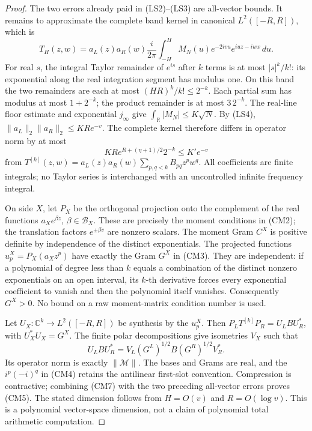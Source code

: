 \documentclass[11pt]{article}
\theoremstyle{remark}\newtheorem{remark}[theorem]{Remark}
\newcommand{\R}{\mathbb R}
\begin{document}
\begin{proof}
The two errors already paid in (LS2)--(LS3) are all-vector bounds.
It remains to approximate the complete band kernel in canonical
\(L^2([-R,R])\), which is
\[
 T_H(z,w)=a_L(z)a_R(w)\frac{i}{2\pi}
           \int_{-H}^H M_N(u)e^{-2ivu}e^{iuz-iuw}\,du.
                                                               \tag{CM6}
\]
For real \(s\), the integral Taylor remainder of \(e^{is}\)
after \(k\) terms is at most \(|s|^k/k!\): its exponential
along the real integration segment has modulus one.
On this band the two remainders are each at most
\((HR)^k/k!\le2^{-k}\). Each partial sum has modulus at
most \(1+2^{-k}\); the product remainder is at most \(3\,2^{-k}\).
The real-line floor estimate and exponential \(j_\infty\)
give \(\int_\R|M_N|\le K\sqrt N\). By (LS4),
\(\|a_L\|_2\|a_R\|_2\le KRe^{-v}\). The complete kernel
therefore differs in operator norm by at most
\[
            KRe^{R+(\eta+1)/2}2^{-k}\le K'e^{-v}       \tag{CM7}
\]
from
\(T^{[k]}(z,w)=a_L(z)a_R(w)\sum_{p,q<k}B_{pq}z^pw^q\).
All coefficients are finite integrals; no Taylor series is
interchanged with an uncontrolled infinite frequency integral.

On side \(X\), let \(P_X\) be the orthogonal projection onto the
complement of the real functions \(a_Xe^{\beta z}\),
\(\beta\in\mathcal B_X\). These are precisely the moment
conditions in (CM2); the translation factors \(e^{\pm\beta v}\)
are nonzero scalars. The moment Gram \(C^X\) is positive
definite by independence of the distinct exponentials.
The projected functions \(u_p^X=P_X(a_Xz^p)\) have exactly
the Gram \(G^X\) in (CM3). They are independent: if a
polynomial of degree less than \(k\) equals a combination
of the distinct nonzero exponentials on an open interval,
its \(k\)-th derivative forces every exponential coefficient
to vanish and then the polynomial itself vanishes.
Consequently \(G^X>0\). No bound on a raw moment-matrix
condition number is used.

Let \(U_X:\mathbb C^k\longrightarrow L^2([-R,R])\) be synthesis
by the \(u_p^X\). Then
\(P_LT^{[k]}P_R=U_LBU_R^*\), with \(U_X^*U_X=G^X\).
The finite polar decompositions give isometries \(V_X\) such that
\[
 U_LBU_R^*=V_L(G^L)^{1/2}B(G^R)^{1/2}V_R^*.
\]
Its operator norm is exactly \(\|\mathcal M\|\). The bases and
Grams are real, and the \(i^p(-i)^q\) in (CM4) retains the
antilinear first-slot convention. Compression is contractive;
combining (CM7) with the two preceding all-vector errors proves
(CM5). The stated dimension follows from \(H=O(v)\) and
\(R=O(\log v)\). This is a polynomial vector-space dimension,
not a claim of polynomial total arithmetic computation.
\end{proof}
\end{document}
